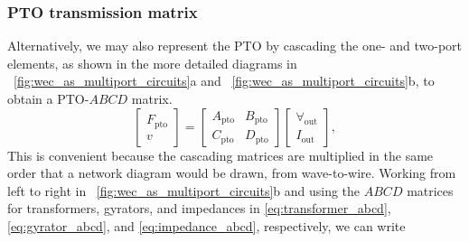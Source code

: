 \documentclass[lettersize,journal]{IEEEtran}
\begin{document}
\subsubsection{PTO transmission matrix}\label{sec:pto_transmission_matrix}
Alternatively, we may also represent the PTO by cascading the one- and two-port elements, as shown in the more detailed diagrams in \figurename~\ref{fig:wec_as_multiport_circuits}a and \figurename~\ref{fig:wec_as_multiport_circuits}b, to obtain a PTO-$ABCD$ matrix.
%
\begin{equation}
	\label{eq:pto_ABCD_mat_def}
	\begin{bmatrix} 
		F_{\textrm{pto}} \\
		v 
	\end{bmatrix} 
	= 
        \begin{bmatrix} 
	A_{\textrm{pto}} & B_{\textrm{pto}} \\ 
	C_{\textrm{pto}} & D_{\textrm{pto}} 
        \end{bmatrix}
	\begin{bmatrix} 
		\forall_{\textrm{out}} \\
		I_{\textrm{out}} 
	\end{bmatrix},
\end{equation}
%
This is convenient because the cascading matrices are multiplied in the same order that a network diagram would be drawn, from wave-to-wire.
Working from left to right in \figurename~\ref{fig:wec_as_multiport_circuits}b and using the $ABCD$ matrices for transformers, gyrators, and impedances in \eqref{eq:transformer_abcd}, \eqref{eq:gyrator_abcd}, and \eqref{eq:impedance_abcd}, respectively, we can write 
%
\end{document}
